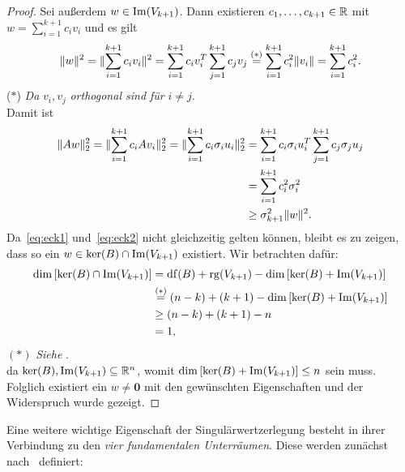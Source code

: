 \begin{proof}
    Sei außerdem \(w \in \operatorname{Im}(V_{k+1})\).
    Dann existieren \(c_{1},\ldots,c_{k+1} \in \mathbb{R}\) mit \(w = \sum_{i=1}^{k+1}c_{i}v_{i}\) und es gilt
    \begin{equation*}
        \lVert w\rVert^{2} = \lVert\sum_{i=1}^{k+1}c_{i}v_{i}\rVert^{2} = \sum_{i=1}^{k+1}c_{i}v_{i}^{T} \sum_{j=1}^{k+1}c_{j}v_{j} \overset{(*)}{=} \sum_{i=1}^{k+1}c_{i}^{2}\lVert v_{i}\rVert = \sum_{i=1}^{k+1}c_{i}^{2}.
    \end{equation*}  
    {\small (\(*\)) \textit{Da} \(v_{i},v_{j}\) \textit{orthogonal sind für} \(i \neq j\).}
    \vspace{5pt}
    \\
    Damit ist
    \begin{align}
        \lVert Aw\rVert_{2}^{2} = \lVert\sum_{i=1}^{k+1}c_{i}Av_{i}\rVert_{2}^{2} = \lVert\sum_{i=1}^{k+1}c_{i}\sigma_{i}u_{i}\rVert_{2}^{2} &= \sum_{i=1}^{k+1}c_{i}\sigma_{i}u_{i}^{T} \sum_{j=1}^{k+1}c_{j}\sigma_{j}u_{j} \notag \\
        &= \sum_{i=1}^{k+1}c_{i}^{2}\sigma_{i}^{2} \notag \\
        &\geq \sigma_{k+1}^{2}\lVert w\rVert^{2} \label{eq:eck2}.
    \end{align}
    Da~\eqref{eq:eck1} und~\eqref{eq:eck2} nicht gleichzeitig gelten können, bleibt es zu zeigen, dass so ein \(w \in \ker(B) \cap \operatorname{Im}(V_{k+1})\) existiert. 
    Wir betrachten dafür:
    \begin{align*}
        \dim\left[\ker(B) \cap \operatorname{Im}(V_{k+1})\right] &= \operatorname{df}(B) + \operatorname{rg}(V_{k+1}) - \dim\left[\ker(B) + \operatorname{Im}(V_{k+1})\right] \\
        &\overset{(*)}{=} (n-k) + (k + 1) - \dim\left[\ker(B) + \operatorname{Im}(V_{k+1})\right] \\
        &\geq (n-k) + (k + 1) -n \\
        &= 1,
    \end{align*}
    {\small \((*)\) \textit{Siehe }.}
    \vspace{5pt}
    \\
    da \(\ker(B),\operatorname{Im}(V_{k+1}) \subseteq \mathbb{R}^{n}\), womit \(\dim\left[\ker(B) + \operatorname{Im}(V_{k+1})\right] \leq n\) sein muss.  
    Folglich existiert ein \(w \neq \symbf{0}\) mit den gewünschten Eigenschaften und der Widerspruch wurde gezeigt.    
\end{proof}
Eine weitere wichtige Eigenschaft der Singulärwertzerlegung besteht in ihrer Verbindung zu den \emph{vier fundamentalen Unterräumen}.
Diese werden zunächst nach~\cite[185]{strangLineareAlgebra2003} definiert:
